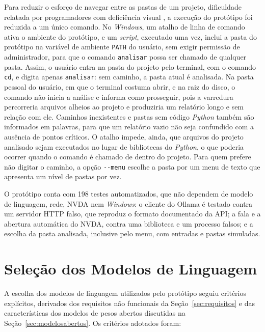 \documentclass[
    12pt,                   %
    openright,              %
    oneside,                %
    a4paper,                %
    sumario=tradicional,    %
    english,                %
    brazil,                 %
    ]{abntex2}
\begin{document}
Para reduzir o esforço de navegar entre as pastas de um projeto, dificuldade relatada por programadores com deficiência visual \cite{latinoware20457}, a execução do protótipo foi reduzida a um único comando. No \textit{Windows}, um atalho de linha de comando ativa o ambiente do protótipo, e um \textit{script}, executado uma vez, inclui a pasta do protótipo na variável de ambiente \texttt{PATH} do usuário, sem exigir permissão de administrador, para que o comando \texttt{analisar} possa ser chamado de qualquer pasta. Assim, o usuário entra na pasta do projeto pelo terminal, com o comando \texttt{cd}, e digita apenas \texttt{analisar}: sem caminho, a pasta atual é analisada. Na pasta pessoal do usuário, em que o terminal costuma abrir, e na raiz do disco, o comando não inicia a análise e informa como prosseguir, pois a varredura percorreria arquivos alheios ao projeto e produziria um relatório longo e sem relação com ele. Caminhos inexistentes e pastas sem código \textit{Python} também são informados em palavras, para que um relatório vazio não seja confundido com a ausência de pontos críticos. O atalho impede, ainda, que arquivos do projeto analisado sejam executados no lugar de bibliotecas do \textit{Python}, o que poderia ocorrer quando o comando é chamado de dentro do projeto. Para quem prefere não digitar o caminho, a opção \texttt{-{}-menu} escolhe a pasta por um menu de texto que apresenta um nível de pastas por vez.

O protótipo conta com 198 testes automatizados, que não dependem de modelo de linguagem, rede, NVDA nem \textit{Windows}: o cliente do Ollama é testado contra um servidor HTTP falso, que reproduz o formato documentado da API; a fala e a abertura automática do NVDA, contra uma biblioteca e um processo falsos; e a escolha da pasta analisada, inclusive pelo menu, com entradas e pastas simuladas.

\section{Seleção dos Modelos de Linguagem}\label{sec:modelos}

A escolha dos modelos de linguagem utilizados pelo protótipo seguiu critérios explícitos, derivados dos requisitos não funcionais da Seção~\ref{sec:requisitos} e das características dos modelos de pesos abertos discutidas na Seção~\ref{sec:modelosabertos}. Os critérios adotados foram:
\end{document}
